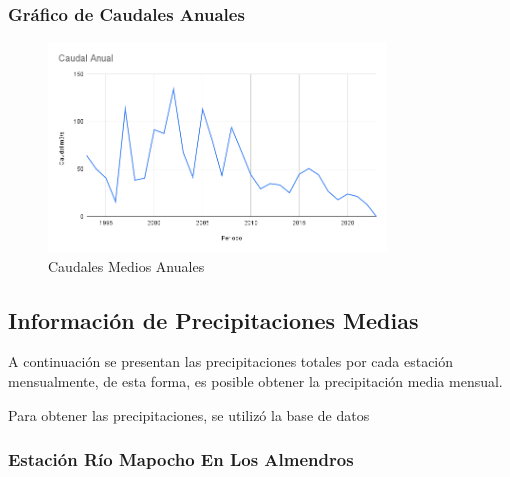 \documentclass{article} %
\begin{document}
\newpage
\subsubsection{Gráfico de Caudales Anuales}
\begin{figure}[h!]
    \centering
    \includegraphics[width=0.8\textwidth]{GRAFICOS/Caudal Anual.png}
    \caption{Caudales Medios Anuales}
    \label{fig:caudales_anual}
\end{figure}

\newpage
\subsection{Información de Precipitaciones Medias}
A continuación se presentan las precipitaciones totales por cada estación mensualmente, de esta forma, es posible obtener la precipitación media mensual. 

Para obtener las precipitaciones, se utilizó la base de datos \textbf{\citet{reportesSNIA}}

\subsubsection{Estación Río Mapocho En Los Almendros}
\end{document}
